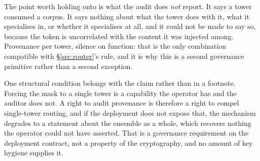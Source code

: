 \documentclass[11pt]{article}
\begin{document}
The point worth holding onto is what the audit does \emph{not} report. It says a tower consumed a corpus. It says nothing about what the tower does with it, what it specialises in, or whether it specialises at all, and it could not be made to say so, because the token is uncorrelated with the content it was injected among. Provenance per tower, silence on function: that is the only combination compatible with \S\ref{sec:router}'s rule, and it is why this is a second governance primitive rather than a second exception.

One structural condition belongs with the claim rather than in a footnote. Forcing the mask to a single tower is a capability the operator has and the auditor does not. A right to audit provenance is therefore a right to compel single-tower routing, and if the deployment does not expose that, the mechanism degrades to a statement about the ensemble as a whole, which recovers nothing the operator could not have asserted. That is a governance requirement on the deployment contract, not a property of the cryptography, and no amount of key hygiene supplies it.
\end{document}

